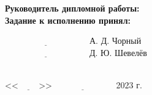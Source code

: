 \documentclass[a4paper]{extreport}
\begin{document}
	\begin{minipage}{0.5\textwidth}
		\textbf{Руководитель дипломной работы:}\\
		\textbf{Задание к исполнению принял:}\\
	\end{minipage}
	\hfill
	\begin{minipage}{0.5\textwidth}
		$\underline{\hspace{4cm}}$ А. Д. Чорный\\
		$\underline{\hspace{4cm}}$ Д. Ю. Шевелёв\\
	\end{minipage}
	\\
	<<$\underline{\hspace{1cm}}$>>$\underline{\hspace{3cm}}$ 2023 г.\\
\end{document}
